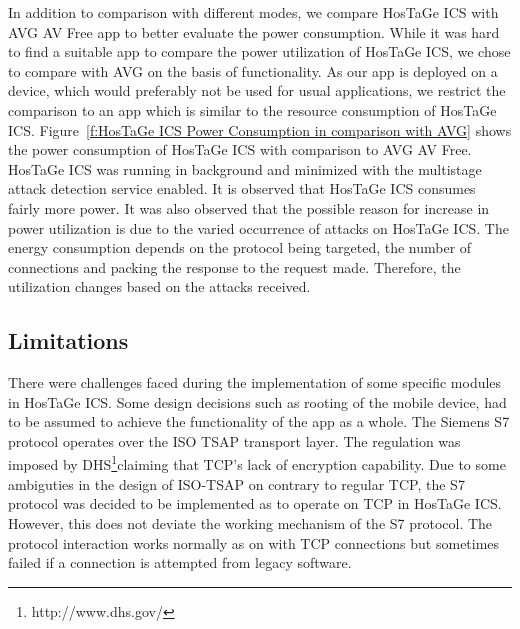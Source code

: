 \documentclass[article,msc=informatik,type=msc,colorback,accentcolor=tud9c]{tudthesis}
\begin{document}
	In addition to comparison with different modes, we compare HosTaGe ICS with AVG AV Free app to better evaluate the power consumption. While it was hard to find a suitable app to compare the power utilization of HosTaGe ICS, we chose to compare with AVG on the basis of functionality. As our app is deployed on a device, which would preferably not be used for usual applications, we restrict the comparison to an app which is similar to the resource consumption of HosTaGe ICS. Figure~\ref{f:HosTaGe ICS Power Consumption in comparison with AVG} shows the power consumption of HosTaGe ICS with comparison to AVG AV Free. HosTaGe ICS was running in background and minimized with the multistage attack detection service enabled. It is observed that HosTaGe ICS consumes fairly more power. It was also observed that the possible reason for increase in power utilization is due to the varied occurrence of attacks on HosTaGe ICS. The energy consumption depends on the protocol being targeted, the number of connections and packing the response to the request made. Therefore, the utilization changes based on the attacks received. 
	


	\subsection{Limitations}\label{Limitations}
	
	
	There were challenges faced during the implementation of some specific modules in HosTaGe ICS. Some design decisions such as rooting of the mobile device, had to be assumed to achieve the functionality of the app as a whole. The Siemens S7 protocol operates over the ISO TSAP transport layer. The regulation was imposed by DHS\footnote{http://www.dhs.gov/}claiming that TCP's lack of encryption capability. Due to some ambiguties in the design of ISO-TSAP on contrary to regular TCP, the S7 protocol was decided to be implemented as to operate on TCP in HosTaGe ICS. However, this does not deviate  the working mechanism of the S7 protocol. The protocol interaction works normally as on with TCP connections but sometimes failed if a connection is attempted from legacy software.
	
\end{document}
